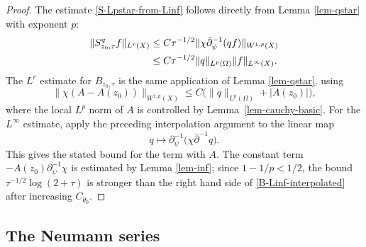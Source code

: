 \documentclass[a4paper,11pt]{article}
\theoremstyle{plain}
\theoremstyle{definition}
\theoremstyle{remark}
\begin{document}
\begin{proof}
The estimate \eqref{S-Lpstar-from-Linf} follows directly from Lemma \ref{lem-qstar} with exponent $p$:
\begin{align}
        \|S^q_{z_0,\tau}f\|_{L^{r}(X)}
        &\leq C \tau^{-1/2}
        \|\chi\bar\partial_\psi^{-1}(qf)\|_{W^{1,p}(X)}          \notag\\
        &\leq C \tau^{-1/2}
        \|q\|_{L^p(\Omega)}\|f\|_{L^\infty(X)} .
\end{align}
The $L^{r}$ estimate for $B_{z_0,\tau}$ is the same application of Lemma \ref{lem-qstar}, using
\begin{equation}
        \|\chi(A-A(z_0))\|_{W^{1,p}(X)}
        \leq C\bigl(\|q\|_{L^p(\Omega)}+|A(z_0)|\bigr),
\end{equation}
where the local $L^p$ norm of $A$ is controlled by Lemma~\ref{lem-cauchy-basic}.  For the $L^\infty$ estimate, apply the preceding interpolation argument to the linear map
\begin{equation}
        q\longmapsto \partial_\psi^{-1}\bigl(\chi\bar\partial^{-1}q\bigr).
\end{equation}
This gives the stated bound for the term with $A$.  The constant term $-A(z_0)\partial_\psi^{-1}\chi$ is estimated by Lemma \ref{lem-inf}; since $1-1/p<1/2$, the bound $\tau^{-1/2}\log(2+\tau)$ is stronger than the right hand side of \eqref{B-Linf-interpolated} after increasing $C_{\theta_0}$.
\end{proof}


\subsection{The Neumann series}
\end{document}
